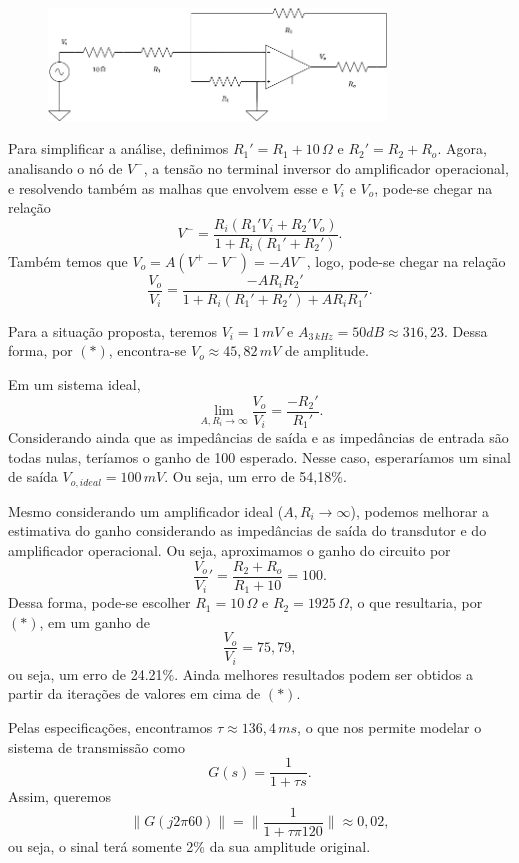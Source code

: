 \documentclass[a4paper]{report}
\begin{document}
\begin{figure}[H]
    \centering
    \includegraphics[width=0.8\textwidth]{figures/lista1-6a.png}
\end{figure}

Para simplificar a análise, definimos $R_1' = R_1 + 10\,\Omega$ e $R_2'=R_2+R_o$. Agora, analisando o nó de $V^{-}$, a tensão no terminal inversor do amplificador operacional, e resolvendo também as malhas que envolvem esse e $V_i$ e $V_o$, pode-se chegar na relação \[
V^{-} = \frac{R_i\left( R_1'V_i+R_2'V_o \right) }{1+R_i\left( R_1'+R_2' \right) }
.\] Também temos que $V_o = A\left( V^{+}-V^{-} \right) = -A V^{-}$, logo, pode-se chegar na relação \[
\frac{V_o}{V_i} = \frac{-AR_iR_2'}{1+R_i\left( R_1'+R_2' \right) +AR_iR_1'} \tag{$*$}
.\] 

Para a situação proposta, teremos $V_i = 1\,mV$ e $A_{3\,kHz} = 50 dB \approx 316,23$. Dessa forma, por $(*)$, encontra-se $V_o \approx 45,82\,mV$ de amplitude.


Em um sistema ideal, \[
\lim_{A,R_i \to \infty} \frac{V_o}{V_i} = \frac{-R_2'}{R_1'}
.\] Considerando ainda que as impedâncias de saída e as impedâncias de entrada são todas nulas, teríamos o ganho de 100 esperado. Nesse caso, esperaríamos um sinal de saída $V_{o,ideal}=100\,mV$. Ou seja, um erro de 54,18\%.


Mesmo considerando um amplificador ideal ($A,R_i \to \infty$), podemos melhorar a estimativa do ganho considerando as impedâncias de saída do transdutor e do amplificador operacional. Ou seja, aproximamos o ganho do circuito por \[
\frac{V_o}{V_i}' = \frac{R_2+R_o}{R_1+10} = 100
.\] Dessa forma, pode-se escolher $R_1=10\,\Omega$ e $R_2=1925\,\Omega$, o que resultaria, por $(*)$, em um ganho de \[
    \frac{V_o}{V_i} = 75,79
,\] ou seja, um erro de 24.21\%. Ainda melhores resultados podem ser obtidos a partir da iterações de valores em cima de $(*)$.


Pelas especificações, encontramos $\tau \approx 136,4\,ms$, o que nos permite modelar o sistema de transmissão como \[
    G(s) = \frac{1}{1+\tau s}
.\] Assim, queremos \[
\|G(j2\pi60)\| = \|\frac{1}{1+\tau\pi120}\| \approx 0,02
,\] ou seja, o sinal terá somente 2\% da sua amplitude original.
\end{document}
